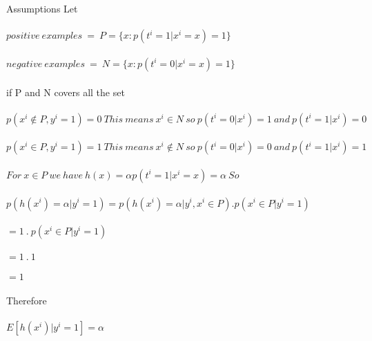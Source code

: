 \newcommand\tab[1][1cm]{\hspace*{#1}}
\begin{answer}
\\ \\ 
Assumptions Let \\ \\
\tab[2.25cm]$positive \ examples \ = \  P = \{ x:p(t^i=1|x^i=x)=1 \}$ \\ \\ 
\tab[2.25cm]$negative \ examples \ = \  N = \{ x:p(t^i=0|x^i=x)=1 \}$ \\ \\
if P and N covers all the set  \\ \\
\tab[1.25cm]$p(x^i \notin P, y^i=1) = 0 \ This \ means \ x^i \in N \ so\ p(t^i=0|x^i)=1 \ and  \ p(t^i=1|x^i)=0$ \\ \\
\tab[1.25cm]$p(x^i \in P, y^i=1) = 1 \ This \ means \ x^i \notin N \ so\ p(t^i=0|x^i)=0 \ and  \ p(t^i=1|x^i)=1$\\ \\
$For \ x \in P \ we \ have \ h(x) = \alpha p (t^i=1|x^i=x) = \alpha  \ So$ \\ \\
\tab[1.25cm]$ p(h(x^i) = \alpha | y^i = 1) = p(h(x^i) = \alpha | y^i,x^i \in P) . p(x^i \in P | y^i=1)$ \\ \\ 
\tab[4.25cm]$ = 1 \ . \ p(x^i \in P | y^i=1)$ \\ \\
\tab[4.25cm]$ = 1 \ . \ 1$\\ \\
\tab[4.25cm]$ = 1$ \\ \\
Therefore \\ \\ 
\tab[3.25cm]$ E[h(x^i)|y^i = 1] = \alpha$ \\ \\ \\ \\
\end{answer}
